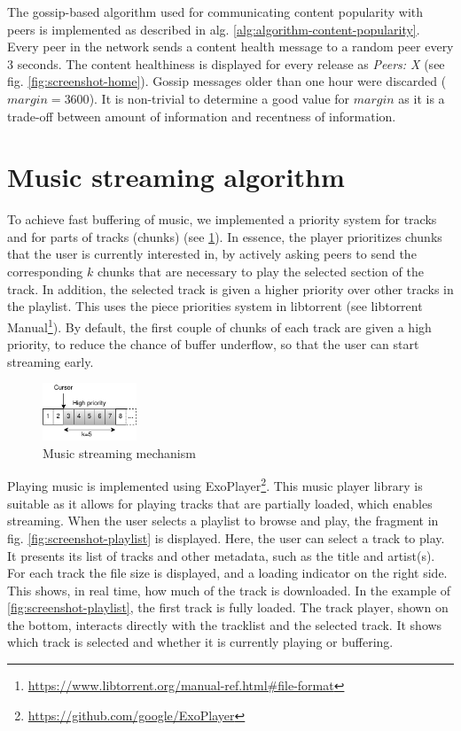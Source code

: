 The gossip-based algorithm used for communicating content popularity with peers is implemented as described in alg. \ref{alg:algorithm-content-popularity}. Every peer in the network sends a content health message to a random peer every 3 seconds. The content healthiness is displayed for every release as \textit{Peers: X} (see fig. \ref{fig:screenshot-home}). Gossip messages older than one hour were discarded ($margin=3600$). It is non-trivial to determine a good value for $margin$ as it is a trade-off between amount of information and recentness of information. 

\section{Music streaming algorithm}
To achieve fast buffering of music, we implemented a priority system for tracks and for parts of tracks (chunks) (see \ref{fig:music-streaming-mechanism}). In essence, the player prioritizes chunks that the user is currently interested in, by actively asking peers to send the corresponding $k$ chunks that are necessary to play the selected section of the track. In addition, the selected track is given a higher priority over other tracks in the playlist. This uses the piece priorities system in libtorrent (see libtorrent Manual\footnote{\url{https://www.libtorrent.org/manual-ref.html\#file-format}}). By default, the first couple of chunks of each track are given a high priority, to reduce the chance of buffer underflow, so that the user can start streaming early. 
\begin{figure}
    \centering
    \includegraphics[width=0.25\textwidth]{implementation/streaming-algorithm.png}
    \caption{Music streaming mechanism}
    \label{fig:music-streaming-mechanism}
\end{figure}

Playing music is implemented using ExoPlayer\footnote{\url{https://github.com/google/ExoPlayer}}. This music player library is suitable as it allows for playing tracks that are partially loaded, which enables streaming. When the user selects a playlist to browse and play, the fragment in fig. \ref{fig:screenshot-playlist} is displayed. Here, the user can select a track to play. It presents its list of tracks and other metadata, such as the title and artist(s). For each track the file size is displayed, and a loading indicator on the right side. This shows, in real time, how much of the track is downloaded. In the example of \ref{fig:screenshot-playlist}, the first track is fully loaded. The track player, shown on the bottom, interacts directly with the tracklist and the selected track. It shows which track is selected and whether it is currently playing or buffering. 


